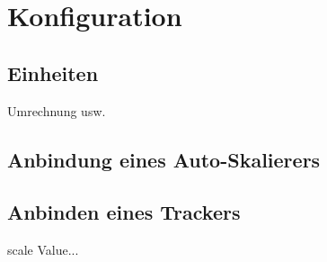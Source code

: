 \chapter{Konfiguration}
\label{ch:Konfiguration}

\section{Einheiten}
Umrechnung usw.


\section{Anbindung eines Auto-Skalierers}
\label{sec:Konfiguration:AnbindungScaler}

\section{Anbinden eines Trackers}

scale Value...


